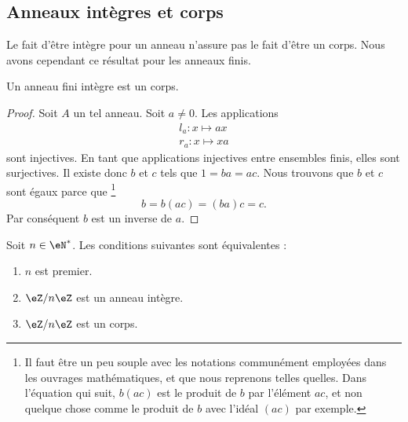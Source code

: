 \subsection{Anneaux intègres et corps}

Le fait d'être intègre pour un anneau n'assure pas le fait d'être un corps. Nous avons cependant ce résultat pour les anneaux finis.

\begin{proposition}     \label{PropanfinintimpCorp}
	Un anneau fini intègre est un corps.
\end{proposition}

\begin{proof}
	Soit \( A\) un tel anneau. Soit \( a\neq 0\). Les applications
	\begin{subequations}
		\begin{align}
			l_a\colon x\mapsto ax \\
			r_a\colon x\mapsto xa
		\end{align}
	\end{subequations}
	sont injectives. En tant que applications injectives entre ensembles finis, elles sont surjectives. Il existe donc \( b\) et \( c\) tels que \( 1=ba=ac\). Nous trouvons que \( b\) et \( c\) sont égaux parce que
	\footnote{Il faut être un peu souple avec les notations communément employées dans les ouvrages mathématiques, et que nous reprenons telles quelles. Dans l'équation qui suit, \( b(ac)\) est le produit de \( b\) par l'élément \( ac\), et non quelque chose comme le produit de \( b\) avec l'idéal \( (ac)\) par exemple.}
	\begin{equation}
		b=b(ac)=(ba)c=c.
	\end{equation}
	Par conséquent \( b\) est un inverse de \( a\).
\end{proof}

\begin{proposition}     \label{PropzhFgNJ}
	Soit \( n\in\eN^*\). Les conditions suivantes sont équivalentes :
	\begin{enumerate}
		\item
		      \( n\) est premier.
		\item
		      \( \eZ/n\eZ\) est un anneau intègre.
		\item
		      \( \eZ/n\eZ\) est un corps.
	\end{enumerate}
\end{proposition}

